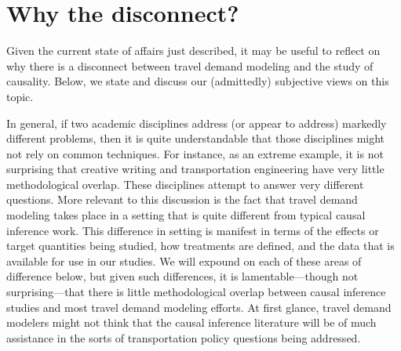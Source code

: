 \section{Why the disconnect?}
\label{sec:why_the_disconnect}
Given the current state of affairs just described, it may be useful to reflect on why there is a disconnect between travel demand modeling and the study of causality. Below, we state and discuss our (admittedly) subjective views on this topic.

In general, if two academic disciplines address (or appear to address) markedly different problems, then it is quite understandable that those disciplines might not rely on common techniques. For instance, as an extreme example, it is not surprising that creative writing and transportation engineering have very little methodological overlap. These disciplines attempt to answer very different questions. More relevant to this discussion is the fact that travel demand modeling takes place in a setting that is quite different from typical causal inference work. This difference in setting is manifest in terms of the effects or target quantities being studied, how treatments are defined, and the data that is available for use in our studies. We will expound on each of these areas of difference below, but given such differences, it is lamentable---though not surprising---that there is little methodological overlap between causal inference studies and most travel demand modeling efforts. At first glance, travel demand modelers might not think that the causal inference literature will be of much assistance in the sorts of transportation policy questions being addressed.


